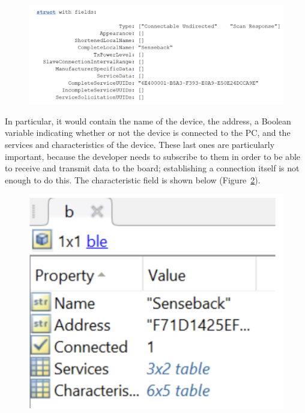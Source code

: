 \documentclass{Configuration_Files/PoliMi3i_thesis}
\begin{document}
\begin{figure}[H]
\centering
\includegraphics[scale=0.7]{Board_Windows_PC/3.png}
\label{fig:ble_object}
\end{figure}

In particular, it would contain the name of the device, the address, a Boolean variable indicating whether or not the device is connected to the PC, and the services and characteristics of the device. These last ones are particularly important, because the developer needs to subscribe to them in order to be able to receive and transmit data to the board; establishing a connection itself is not enough to do this. The characteristic field is shown below (Figure~\ref{fig:characteristics}).

\begin{figure}[H]
\centering
\includegraphics[scale=0.7]{Board_Windows_PC/4.png}
\label{fig:characteristics}
\end{figure}
\end{document}
